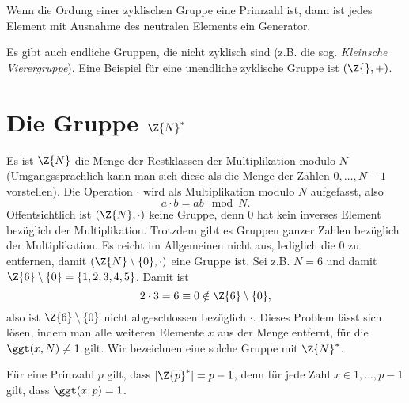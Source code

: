 \begin{theorem} 
Wenn die Ordung einer zyklischen Gruppe eine Primzahl ist, dann ist
jedes Element mit Ausnahme des neutralen Elements ein Generator. 
\end{theorem}

Es gibt auch endliche Gruppen, die nicht zyklisch sind (z.B. die
sog. \emph{Kleinsche Vierergruppe}). Eine Beispiel für eine unendliche
zyklische Gruppe ist $(\Z{}, + )$.
\section{Die Gruppe $\Z{N}^*$}
Es ist $\Z{N}$ die Menge der Restklassen der Multiplikation modulo $N$
(Umgangssprachlich kann man sich diese als die Menge der Zahlen
${0,\dots , N-1}$ vorstellen). Die Operation $\cdot$ wird als
Multiplikation modulo $N$ aufgefasst, also 
\[
a \cdot b = ab \mod N.
\]
 Offentsichtlich
ist $(\Z{N}, \cdot)$ keine Gruppe, denn $0$ hat kein inverses Element
bezüglich der Multiplikation.
Trotzdem gibt es Gruppen ganzer Zahlen bezüglich der
Multiplikation. Es reicht im Allgemeinen nicht aus, lediglich die $0$ zu
entfernen, damit $(\Z{N}\setminus \{0\}, \cdot)$ eine Gruppe ist. Sei
z.B. $N=6$ und damit $\Z{6}\setminus \{0\} = \{1,2,3,4,5\}$. Damit ist  
\[
2 \cdot 3 = 6 \equiv 0 \notin \Z{6}\setminus \{0\},
\]
also ist $\Z{6}\setminus \{0\}$ nicht abgeschlossen bezüglich $\cdot$. 
Dieses Problem lässt sich lösen, indem man alle weiteren Elemente $x$ aus
der Menge entfernt, für die $\ggt(x, N)\neq 1$ gilt. Wir bezeichnen eine
solche Gruppe mit $\Z{N}^*$. 

Für eine Primzahl $p$ gilt, dass  $|\Z{p}^*|= p-1$, denn für jede Zahl $x\in
{1,..., p-1}$ gilt, dass $\ggt(x, p)=1$.

